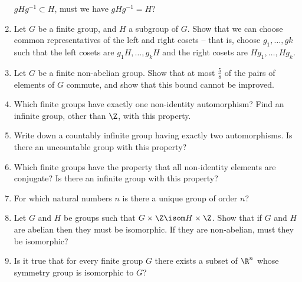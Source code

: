 \documentclass[a4paper,12pt]{article}
\begin{document}
\begin{enumerate}
       \(gHg^{-1} \subset H\), must we have \(gHg^{-1} = H\)?
 \item Let \(G\) be a finite group, and \(H\) a subgroup of \(G\). Show that we
       can choose common representatives of the left and right cosets – that is,
       choose \(g_1, \dotsc, gk\) such that the left cosets are
       \(g_1 H, \dotsc, g_k H\) and the right cosets are
       \(H g_1, \dotsc, H g_k\).
 \item Let \(G\) be a finite non-abelian group. Show that at most \(\frac 58\)
       of the pairs of elements of \(G\) commute, and show that this bound
       cannot be improved.
 \item Which finite groups have exactly one non-identity automorphism? Find an
       infinite group, other than \(\Z\), with this property.
 \item Write down a countably infinite group having exactly two automorphisms.
       Is there an uncountable group with this property?
 \item Which finite groups have the property that all non-identity elements are
       conjugate? Is there an infinite group with this property?
 \item For which natural numbers \(n\) is there a unique group of order \(n\)?
 \item Let \(G\) and \(H\) be groups such that
       \(G \times \Z \isom H \times \Z\). Show that if \(G\) and \(H\) are
       abelian then they must be isomorphic. If they are non-abelian, must they
       be isomorphic?
 \item Is it true that for every finite group \(G\) there exists a subset of
       \(\R^n\) whose symmetry group is isomorphic to \(G\)?
\end{enumerate}
\end{document}
